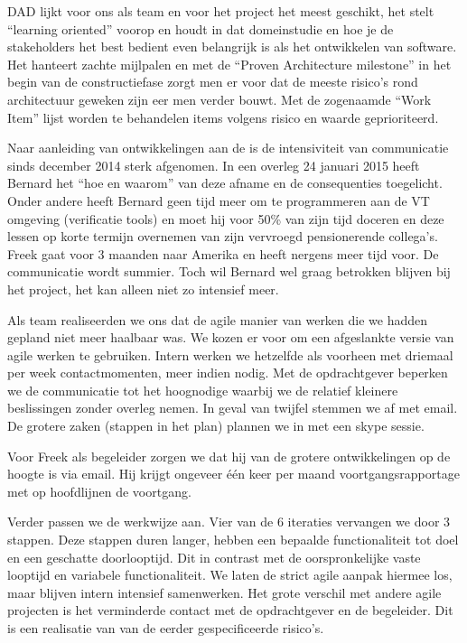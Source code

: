 \begin{description}
DAD lijkt voor ons als team en voor het project het meest geschikt, het stelt
``learning oriented'' voorop en houdt in dat domeinstudie en hoe je de stakeholders
het best bedient even belangrijk is als het ontwikkelen van software. Het hanteert
zachte mijlpalen en met de ``Proven Architecture milestone''  in het begin van de
constructiefase zorgt men er voor dat de meeste risico's rond architectuur geweken
zijn eer men verder bouwt. Met de zogenaamde ``Work Item''  lijst worden te behandelen
items volgens risico en waarde geprioriteerd.

\begin{aanpassing1}\label{aanp1: toelichting}
Naar aanleiding van ontwikkelingen aan de \ou is de intensiviteit van communicatie sinds 
december 2014 sterk afgenomen. In een overleg 24 januari 2015 heeft Bernard het ``hoe en waarom'' 
van deze afname en de consequenties toegelicht. Onder andere heeft Bernard geen tijd meer 
om te programmeren aan de VT omgeving (verificatie tools) en moet hij voor 50\% van zijn tijd 
doceren en deze lessen op korte termijn overnemen van zijn vervroegd pensionerende collega's.
Freek gaat voor 3 maanden naar Amerika en heeft nergens meer tijd voor. De communicatie wordt summier. 
Toch wil Bernard wel graag betrokken blijven bij het project, het kan alleen niet zo intensief meer.

Als team realiseerden we ons dat de agile manier van werken die we hadden gepland niet meer haalbaar was.
We kozen er voor om een afgeslankte versie van agile werken te gebruiken. Intern werken we hetzelfde als 
voorheen met driemaal per week contactmomenten, meer indien nodig. Met de opdrachtgever beperken we de 
communicatie tot het hoognodige waarbij we de relatief kleinere beslissingen zonder overleg nemen. In geval
van twijfel stemmen we af met email. De grotere zaken (stappen in het plan) plannen we in met een skype sessie.

Voor Freek als begeleider zorgen we dat hij van de grotere ontwikkelingen op de hoogte is via email. Hij
krijgt ongeveer \'{e}\'{e}n keer per maand voortgangsrapportage met op hoofdlijnen de voortgang.

Verder passen we de werkwijze aan. Vier van de 6 iteraties vervangen we door 3 stappen. Deze stappen
duren langer, hebben een bepaalde functionaliteit tot doel en een geschatte doorlooptijd. Dit in contrast
met de oorspronkelijke vaste looptijd en variabele functionaliteit. We laten de strict agile aanpak hiermee 
los, maar blijven intern intensief samenwerken. Het grote verschil met andere agile projecten is het 
verminderde contact met de opdrachtgever  en de begeleider. Dit is een realisatie van \een van de 
eerder gespecificeerde risico's.


\end{aanpassing1}
\end{description}

